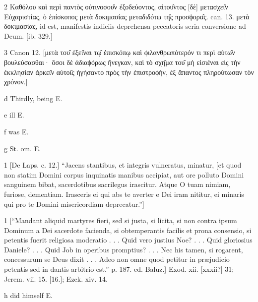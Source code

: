 2
Καθόλου καὶ περὶ παντὸς οὑτινοσου̑ν ἐξοδεύοντος, αἰτου̑ντος [δὲ] μετασχει̑ν Εὐχαριστίας, ὁ ἐπίσκοπος μετὰ δοκιμασίας μεταδιδότω τη̑ς προσϕορα̑ς. can. 13. μετὰ δοκιμασίας, id est, manifestis indiciis deprehensa peccatoris seria conversione ad Deum. [ib. 329.]

3
Canon 12. [μετὰ του̑ ἐξει̑ναι τῳ̑ ἐπισκόπῳ καὶ ϕιλανθρωπότερόν τι περὶ αὐτω̑ν βουλεύσασθαι· ὅσοι δὲ ἀδιαϕόρως ἤνεγκαν, καὶ τὸ σχη̑μα του̑ μὴ εἰσιέναι εἰς τὴν ἐκκλησίαν ἀρκει̑ν αὐτοι̑ς ἡγήσαντο πρὸς τὴν ἐπιστροϕὴν, ἐξ ἅπαντος πληρούτωσαν τὸν χρόνον.]

d
Thirdly, being E.

e
ill E.

f
was E.

g
St. om. E.

1
[De Laps. c. 12.] “Jacens stantibus, et integris vulneratus, minatur, [et quod non statim Domini corpus inquinatis manibus accipiat, aut ore polluto Domini sanguinem bibat, sacerdotibus sacrilegus irascitur. Atque O tuam nimiam, furiose, dementiam. Irasceris ei qui abs te averter e Dei iram nititur, ei minaris qui pro te Domini misericordiam deprecatur.”]

1
[“Mandant aliquid martyres fieri, sed si justa, si licita, si non contra ipsum Dominum a Dei sacerdote facienda, si obtemperantis facilis et prona consensio, si petentis fuerit religiosa moderatio . . . Quid vero justius Noe? . . . Quid gloriosius Daniele? . . . Quid Job in operibus promptius? . . . Nec his tamen, si rogarent, concessurum se Deus dixit . . . Adeo non omne quod petitur in præjudicio petentis sed in dantis arbitrio est.” p. 187. ed. Baluz.] Exod. xii. [xxxii?] 31; Jerem. vii. 15. [16.]; Ezek. xiv. 14.

h
did himself E.


